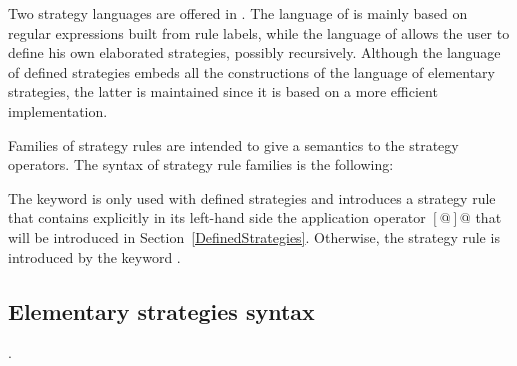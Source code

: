 

Two strategy languages are offered in \elan.  The language of   is mainly based on regular expressions
built from rule labels, while the language of 
 allows the user to define his own elaborated
strategies, possibly recursively.  Although the language of defined strategies
embeds all the constructions of the language of elementary strategies, the
latter is maintained since it is based on a more efficient implementation.

Families of strategy rules are intended to give a semantics to
the strategy operators.
The syntax of strategy rule families is the following:




The keyword  is only used with defined strategies and 
introduces a strategy rule that contains explicitly in its left-hand
side the application operator  $[@]@$ that will be introduced 
in Section~\ref{DefinedStrategies}.
Otherwise, the strategy rule is introduced by the keyword
.

\subsection{Elementary strategies syntax}
\label{ElementaryStrategies}.

